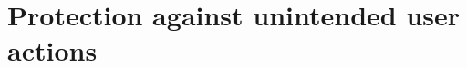 \documentclass[Main]{subfiles}
\begin{document}
\section{Protection against unintended user actions}
\end{document}
